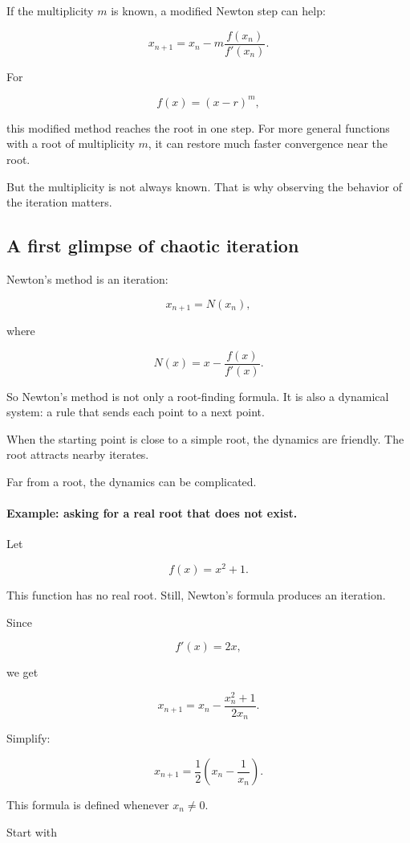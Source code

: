 If the multiplicity \(m\) is known, a modified Newton step can help:

\[
\boxed{
x_{n+1}=x_n-m\frac{f(x_n)}{f'(x_n)}.
}
\]

For

\[
f(x)=(x-r)^m,
\]

this modified method reaches the root in one step.  For more general functions with a
root of multiplicity \(m\), it can restore much faster convergence near the root.

But the multiplicity is not always known.  That is why observing the behavior of the
iteration matters.

\subsection{A first glimpse of chaotic iteration}
\label{subsec:first-glimpse-chaotic-iteration}

Newton's method is an iteration:

\[
x_{n+1}=N(x_n),
\]

where

\[
N(x)=x-\frac{f(x)}{f'(x)}.
\]

So Newton's method is not only a root-finding formula.  It is also a dynamical system:
a rule that sends each point to a next point.

When the starting point is close to a simple root, the dynamics are friendly.  The root
attracts nearby iterates.

Far from a root, the dynamics can be complicated.

\paragraph{Example: asking for a real root that does not exist.}
Let

\[
f(x)=x^2+1.
\]

This function has no real root.  Still, Newton's formula produces an iteration.

Since

\[
f'(x)=2x,
\]

we get

\[
x_{n+1}
=
x_n-\frac{x_n^2+1}{2x_n}.
\]

Simplify:

\[
\boxed{
x_{n+1}
=
\frac12\left(x_n-\frac1{x_n}\right).
}
\]

This formula is defined whenever \(x_n\neq0\).

Start with

